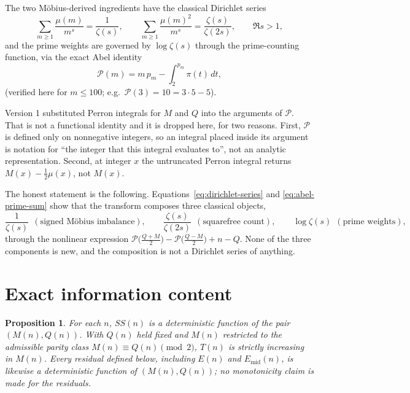 \documentclass[11pt]{amsart}
\numberwithin{equation}{section}
\theoremstyle{plain}
\newtheorem{proposition}[theorem]{Proposition}
\theoremstyle{definition}
\theoremstyle{remark}
\newcommand{\mob}{\mu}
\newcommand{\Mert}{M}
\newcommand{\Sq}{Q}
\newcommand{\PS}{\mathcal P}
\begin{document}
The two M\"obius-derived ingredients have the classical Dirichlet series \cite{Apostol1976}
\begin{equation}
\label{eq:dirichlet-series}
\sum_{m\ge1}\frac{\mob(m)}{m^s}=\frac1{\zeta(s)},
\qquad
\sum_{m\ge1}\frac{\mob(m)^2}{m^s}=\frac{\zeta(s)}{\zeta(2s)},
\qquad \Re s>1,
\end{equation}
and the prime weights are governed by $\log\zeta(s)$ through the prime-counting
function, via the exact Abel identity
\begin{equation}
\label{eq:abel-prime-sum}
\PS(m)=m\,p_m-\int_2^{p_m}\pi(t)\,dt ,
\end{equation}
(verified here for $m\le100$; e.g.\ $\PS(3)=10=3\cdot5-5$).

Version 1 substituted Perron integrals for $\Mert$ and $\Sq$ into the arguments
of $\PS$. That is not a functional identity and it is dropped here, for two
reasons. First, $\PS$ is defined only on nonnegative integers, so an integral
placed inside its argument is notation for ``the integer that this integral
evaluates to'', not an analytic representation. Second, at integer $x$ the
untruncated Perron integral returns $\Mert(x)-\tfrac12\mob(x)$, not $\Mert(x)$.

The honest statement is the following. Equations~\eqref{eq:dirichlet-series} and
\eqref{eq:abel-prime-sum} show that the transform composes three classical objects,
\begin{equation}
\label{eq:zeta-components}
\frac1{\zeta(s)}\ \ (\text{signed M\"obius imbalance}),
\qquad
\frac{\zeta(s)}{\zeta(2s)}\ \ (\text{squarefree count}),
\qquad
\log\zeta(s)\ \ (\text{prime weights}),
\end{equation}
through the nonlinear expression
$\PS\bigl(\tfrac{\Sq+\Mert}2\bigr)-\PS\bigl(\tfrac{\Sq-\Mert}2\bigr)+n-\Sq$.
None of the three components is new, and the composition is not a Dirichlet
series of anything.

\section{Exact information content}
\label{sec:information}

\begin{proposition}\label{prop:info}
For each $n$, $SS(n)$ is a deterministic function of the pair
$(\Mert(n),\Sq(n))$. With $\Sq(n)$ held fixed and $\Mert(n)$ restricted to the
admissible parity class $\Mert(n)\equiv\Sq(n)\pmod 2$, $T(n)$ is strictly
increasing in $\Mert(n)$. Every residual defined below, including $E(n)$ and
$E_{\mathrm{mid}}(n)$, is likewise a deterministic function of
$(\Mert(n),\Sq(n))$; no monotonicity claim is made for the residuals.
\end{proposition}
\end{document}
